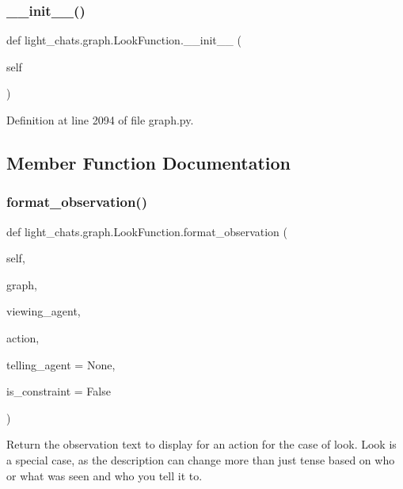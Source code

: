 \subsubsection{\texorpdfstring{\+\_\+\+\_\+init\+\_\+\+\_\+()}{\_\_init\_\_()}}
{\footnotesize\ttfamily def light\+\_\+chats.\+graph.\+Look\+Function.\+\_\+\+\_\+init\+\_\+\+\_\+ (\begin{DoxyParamCaption}\item[{}]{self }\end{DoxyParamCaption})}



Definition at line 2094 of file graph.\+py.



\subsection{Member Function Documentation}
\mbox{\label{classlight__chats_1_1graph_1_1LookFunction_a7723e1da8ce79443c49fd4a5f6dce978}} 
\subsubsection{\texorpdfstring{format\+\_\+observation()}{format\_observation()}}
{\footnotesize\ttfamily def light\+\_\+chats.\+graph.\+Look\+Function.\+format\+\_\+observation (\begin{DoxyParamCaption}\item[{}]{self,  }\item[{}]{graph,  }\item[{}]{viewing\+\_\+agent,  }\item[{}]{action,  }\item[{}]{telling\+\_\+agent = {\ttfamily None},  }\item[{}]{is\+\_\+constraint = {\ttfamily False} }\end{DoxyParamCaption})}

\begin{DoxyVerb}Return the observation text to display for an action for the case
of look. Look is a special case, as the description can change more
than just tense based on who or what was seen and who you tell it to.
\end{DoxyVerb}
 

